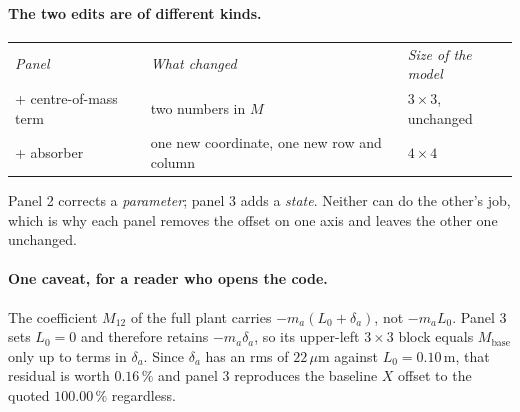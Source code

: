 \paragraph{The two edits are of different kinds.}
%
\begin{center}
\begin{tabular}{@{}lll@{}}
  \textit{Panel} & \textit{What changed} & \textit{Size of the model} \\[0.6mm]
  + centre-of-mass term & two numbers in $M$ & $3\times 3$, unchanged \\
  + absorber            & one new coordinate, one new row and column & $4\times 4$ \\
\end{tabular}
\end{center}
%
Panel 2 corrects a \emph{parameter}; panel 3 adds a \emph{state}. Neither can do the other's job,
which is why each panel removes the offset on one axis and leaves the other one unchanged.

\paragraph{One caveat, for a reader who opens the code.}
The coefficient $M_{12}$ of the full plant carries $-m_a(L_0 + \delta_a)$, not $-m_a L_0$. Panel 3
sets $L_0 = 0$ and therefore retains $-m_a \delta_a$, so its upper-left $3\times 3$ block equals
$M_{\mathrm{base}}$ only up to terms in $\delta_a$. Since $\delta_a$ has an rms of
$22\,\mu\mathrm{m}$ against $L_0 = 0.10\,\mathrm{m}$, that residual is worth $0.16\,\%$ and panel
3 reproduces the baseline $X$ offset to the quoted $100.00\,\%$ regardless.
